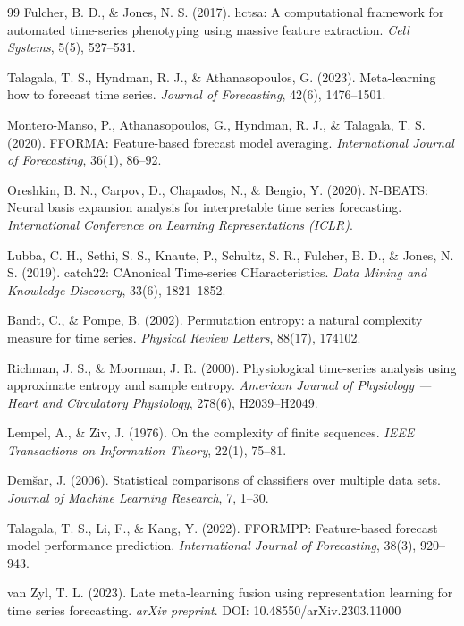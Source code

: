 {\begin{thebibliography}{99}
Fulcher, B. D., \& Jones, N. S. (2017). hctsa: A computational framework for
automated time-series phenotyping using massive feature extraction.
\emph{Cell Systems}, 5(5), 527--531.

Talagala, T. S., Hyndman, R. J., \& Athanasopoulos, G. (2023). Meta-learning how to
forecast time series. \emph{Journal of Forecasting}, 42(6), 1476--1501.

Montero-Manso, P., Athanasopoulos, G., Hyndman, R. J., \& Talagala, T. S. (2020).
FFORMA: Feature-based forecast model averaging.
\emph{International Journal of Forecasting}, 36(1), 86--92.

Oreshkin, B. N., Carpov, D., Chapados, N., \& Bengio, Y. (2020). N-BEATS: Neural basis
expansion analysis for interpretable time series forecasting.
\emph{International Conference on Learning Representations (ICLR)}.

Lubba, C. H., Sethi, S. S., Knaute, P., Schultz, S. R., Fulcher, B. D., \& Jones, N. S.
(2019). catch22: CAnonical Time-series CHaracteristics.
\emph{Data Mining and Knowledge Discovery}, 33(6), 1821--1852.

Bandt, C., \& Pompe, B. (2002). Permutation entropy: a natural complexity measure
for time series. \emph{Physical Review Letters}, 88(17), 174102.

Richman, J. S., \& Moorman, J. R. (2000). Physiological time-series analysis using
approximate entropy and sample entropy.
\emph{American Journal of Physiology --- Heart and Circulatory Physiology},
278(6), H2039--H2049.

Lempel, A., \& Ziv, J. (1976). On the complexity of finite sequences.
\emph{IEEE Transactions on Information Theory}, 22(1), 75--81.

Dem\v{s}ar, J. (2006). Statistical comparisons of classifiers over multiple data
sets. \emph{Journal of Machine Learning Research}, 7, 1--30.

Talagala, T. S., Li, F., \& Kang, Y. (2022). FFORMPP: Feature-based forecast model
performance prediction.
\emph{International Journal of Forecasting}, 38(3), 920--943.

van Zyl, T. L. (2023). Late meta-learning fusion using representation learning for
time series forecasting. \emph{arXiv preprint}. DOI: 10.48550/arXiv.2303.11000


\end{thebibliography}}
